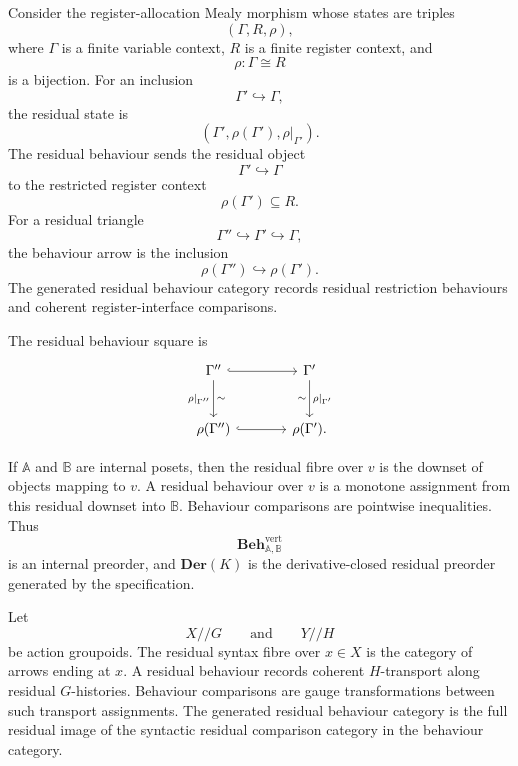 \begin{example}
\label{ex:register-allocation-myhill-nerode}
    Consider the register-allocation Mealy morphism whose states are triples
    \[
        (\Gamma,R,\rho),
    \]
    where \(\Gamma\) is a finite variable context, \(R\) is a finite register context, and
    \[
        \rho:\Gamma\cong R
    \]
    is a bijection. For an inclusion
    \[
        \Gamma'\hookrightarrow\Gamma,
    \]
    the residual state is
    \[
        (\Gamma',\rho(\Gamma'),\rho|_{\Gamma'}).
    \]
    The residual behaviour sends the residual object
    \[
        \Gamma'\hookrightarrow\Gamma
    \]
    to the restricted register context
    \[
        \rho(\Gamma')\subseteq R.
    \]
    For a residual triangle
    \[
        \Gamma''\hookrightarrow\Gamma'\hookrightarrow\Gamma,
    \]
    the behaviour arrow is the inclusion
    \[
        \rho(\Gamma'')\hookrightarrow\rho(\Gamma').
    \]
    The generated residual behaviour category records residual restriction behaviours and coherent register-interface comparisons.

    The residual behaviour square is
    \[
        \begin{tikzcd}[column sep=large, row sep=large]
                \Gamma''
                    \arrow[r, hook]
                    \arrow[d, "{\rho|_{\Gamma''}}"', "\sim"]
            &
                \Gamma'
                    \arrow[d, "{\rho|_{\Gamma'}}", "\sim"']
            \\
                \rho(\Gamma'')
                    \arrow[r, hook]
            &
                \rho(\Gamma').
        \end{tikzcd}
    \]
\end{example}

\begin{example}
\label{ex:poset-valued-systems}
    If \(\mathbb A\) and \(\mathbb B\) are internal posets, then the residual fibre over \(v\) is the downset of objects mapping to \(v\). A residual behaviour over \(v\) is a monotone assignment from this residual downset into \(\mathbb B\). Behaviour comparisons are pointwise inequalities. Thus
    \[
        \mathbf{Beh}^{\mathrm{vert}}_{\mathbb A,\mathbb B}
    \]
    is an internal preorder, and \(\mathbf{Der}(K)\) is the derivative-closed residual preorder generated by the specification.
\end{example}

\begin{example}
\label{ex:action-groupoids-gauge-comparisons}
    Let
    \[
        X/\!/G
        \qquad\text{and}\qquad
        Y/\!/H
    \]
    be action groupoids. The residual syntax fibre over \(x\in X\) is the category of arrows ending at \(x\). A residual behaviour records coherent \(H\)-transport along residual \(G\)-histories. Behaviour comparisons are gauge transformations between such transport assignments. The generated residual behaviour category is the full residual image of the syntactic residual comparison category in the behaviour category.
\end{example}


